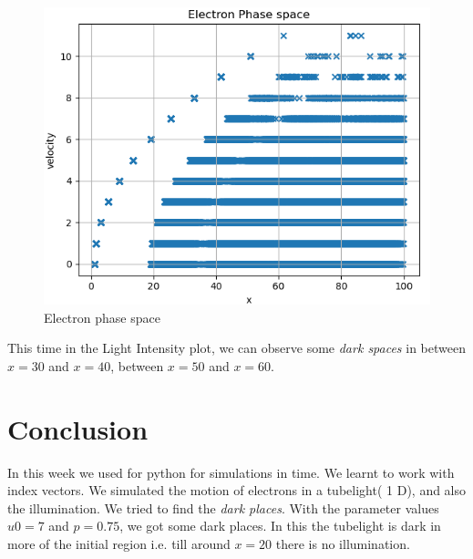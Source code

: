 \documentclass[11pt, a4paper]{article}
\begin{document}
    \begin{figure}[!h]
        \centering
        \includegraphics[scale = 0.6]{Figure 7.png}
        \caption{Electron phase space}
        \label{fig:Figure 7}
    \end{figure}
    This time in the Light Intensity plot, we can observe some \textit{dark spaces} in between $x = 30$ and $x = 40$, between $x = 50$ and $x = 60$.
\section{Conclusion}
    In this week we used for python for simulations in time. We learnt to work with index vectors. We simulated the motion of electrons in a tubelight( 1 D), and also the illumination. We tried to find the \textit{dark places}. With the parameter values $u0 = 7$ and $p = 0.75$, we got some dark places. In this the tubelight is dark in more of the initial region i.e. till around $x = 20$ there is no illumination.
\end{document}
